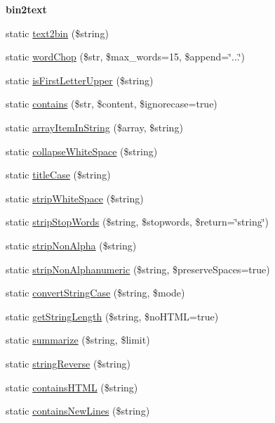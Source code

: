 \begin{Indent}{\bf bin2text}
\begin{DoxyCompactItemize}
\item 
static \hyperlink{class_strings_a33c5291b653ff2206b2cbe20d964a8d5}{text2bin} (\$string)
\item 
static \hyperlink{class_strings_a85edab32c64819bd643e9ecacc70b44c}{word\-Chop} (\$str, \$max\-\_\-words=15, \$append=\char`\"{}...\char`\"{})
\item 
static \hyperlink{class_strings_a95b50e435d55cfebf1ac2486eaae8835}{is\-First\-Letter\-Upper} (\$string)
\item 
static \hyperlink{class_strings_a4451073c8c3119ff31e49b46391c0b3c}{contains} (\$str, \$content, \$ignorecase=true)
\item 
static \hyperlink{class_strings_a699ea72b8f917242d696d255e1f76900}{array\-Item\-In\-String} (\$array, \$string)
\item 
static \hyperlink{class_strings_a93d0172bd1ab63537c0d02ccdcaf3061}{collapse\-White\-Space} (\$string)
\item 
static \hyperlink{class_strings_abd24a61306ecb799a2adabef65247e2f}{title\-Case} (\$string)
\item 
static \hyperlink{class_strings_a782eece98ad394adfa64e4af99fadfe3}{strip\-White\-Space} (\$string)
\item 
static \hyperlink{class_strings_aaf373089670ff613a70d83e2c8ec365c}{strip\-Stop\-Words} (\$string, \$stopwords, \$return=\char`\"{}string\char`\"{})
\item 
static \hyperlink{class_strings_abd0e05f655bf76e9f62cf6fb23292614}{strip\-Non\-Alpha} (\$string)
\item 
static \hyperlink{class_strings_a817de41e0d46286812ed0127ad0df125}{strip\-Non\-Alphanumeric} (\$string, \$preserve\-Spaces=true)
\item 
static \hyperlink{class_strings_ab2f59b99300d229bea043ad921f9d538}{convert\-String\-Case} (\$string, \$mode)
\item 
static \hyperlink{class_strings_a27f8b9f20d4cd33f3ef79ddde570e5ea}{get\-String\-Length} (\$string, \$no\-H\-T\-M\-L=true)
\item 
static \hyperlink{class_strings_a5bd9b345132aed7f39d611166fb4fc18}{summarize} (\$string, \$limit)
\item 
static \hyperlink{class_strings_a59b8d57d296bc89f40a28fd4cdcc93bd}{string\-Reverse} (\$string)
\item 
static \hyperlink{class_strings_abfb5ae4544ea4dc1bd441272d6961c77}{contains\-H\-T\-M\-L} (\$string)
\item 
static \hyperlink{class_strings_ab2c5b8773fa81a3c0aa305d142af3d8b}{contains\-New\-Lines} (\$string)

\end{DoxyCompactItemize}
\end{Indent}
